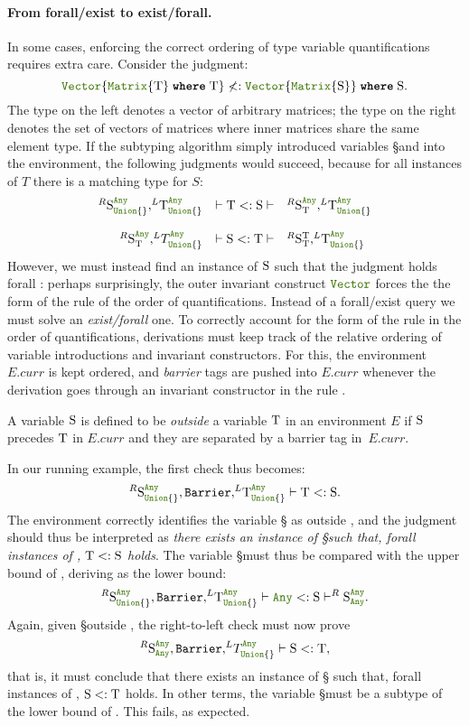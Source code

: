 \paragraph{From forall/exist to exist/forall.}  In some cases,
enforcing the correct ordering of type variable quantifications
requires extra care.  Consider the judgment:
\[ \vectyp{\wheret{\mattyp{\T}}{\T}} \nless: 
  \wheret{\vectyp{\mattyp{\S}}}{\S}. \]
The type on the left denotes a vector of arbitrary matrices;
the type on the right denotes the set of vectors of matrices where 
inner matrices share the same element type.
If the subtyping algorithm simply introduced variables \S and \T into
the environment, the following judgments would succeed, because
for all instances of \(T\) there is a matching type for \(S\):
\[
\begin{array}{rcl}
  ^R \S_{\uniontyp{}}^{\anytyp}, ^L\!\T_{\uniontyp{}}^{\anytyp} & \vdash \T <: \S
    \vdash & ^R \S_{\T}^{\anytyp}, ^L\!\T_{\uniontyp{}}^{\anytyp} \\
  \\
  ^R \S_{\T}^{\anytyp}, ^L\!T_{\uniontyp{}}^{\anytyp} & \vdash \S <: \T
    \vdash & ^R \S_{\T}^{\T}, ^L\!\T_{\uniontyp{}}^{\anytyp}
\end{array}
\]
However, we must instead find an instance of \(\S\) such that 
the judgment holds forall \T: perhaps surprisingly, the outer invariant
construct \(\jlname{Vector}\) forces the the form of the rule of the order of quantifications.
Instead of a forall/exist query we must solve an \emph{exist/forall} one.
To correctly account for the form of the rule in the order of quantifications,
derivations must keep track of the relative ordering of
variable introductions and invariant constructors.  For this, the
environment \(E.curr\) is kept ordered, and
\emph{barrier} tags are pushed into \(E.curr\) whenever the derivation goes through
an invariant constructor in the rule .

A variable \(\S\) is defined to be \emph{outside} a variable
\(\T\) in an environment \(E\) if \(\S\) precedes \(\T\)
in \(E.curr\) and they are separated by a barrier tag in~\(E.curr\).  

In our running example, the first check thus becomes:
\[ ^R \S_{\uniontyp{}}^{\anytyp}, \Barrier, ^L\!\T_{\uniontyp{}}^{\anytyp} 
\vdash \T <: \S. \]
\noindent The environment correctly identifies the variable \S
as outside \T, and the judgment should thus be interpreted as
\emph{there exists an instance of \S such that, forall instances of
\T, \( \T <: \S \) holds}.  The variable \S must thus be
compared with the upper bound of \T, deriving \anytyp as the lower bound:
\[ 
  ^R \S_{\uniontyp{}}^{\anytyp}, \Barrier, ^L\!\T_{\uniontyp{}}^{\anytyp} 
  \vdash \anytyp <: \S \vdash ^R \S_{\anytyp}^{\anytyp}.
\]
Again, given \S outside \T, the right-to-left check must now prove
\[ ^R \S_{\anytyp}^{\anytyp}, \Barrier, ^L\!T_{\uniontyp{}}^{\anytyp} 
\vdash \S <: \T, \]
that is, it must conclude that there exists an instance of \S
such that, forall instances of \T, \(\S <: \T\) holds.  In
other terms, the variable \S must be a subtype of the lower
bound of \T.  This fails, as expected.

